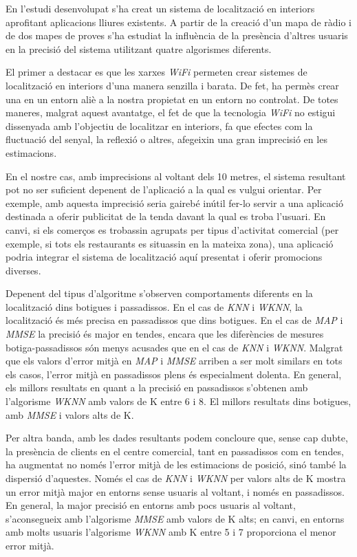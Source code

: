 
En l'estudi desenvolupat s'ha creat un sistema de localització en interiors aprofitant aplicacions lliures existents. A partir de la creació d'un mapa de ràdio i de dos mapes de proves s'ha estudiat la influència de la presència d'altres usuaris en la precisió del sistema utilitzant quatre algorismes diferents.

El primer a destacar es que les xarxes \textit{WiFi} permeten crear sistemes de localització en interiors d'una manera senzilla i barata. De fet, ha permès crear una en un entorn aliè a la nostra propietat en un entorn no controlat. De totes maneres, malgrat aquest avantatge, el fet de que la tecnologia \textit{WiFi} no estigui dissenyada amb l'objectiu de localitzar en interiors, fa  que efectes com la fluctuació del senyal, la reflexió o altres, afegeixin una gran imprecisió en les estimacions.

En el nostre cas, amb imprecisions al voltant dels 10 metres, el sistema resultant pot no ser suficient depenent de l'aplicació a la qual es vulgui orientar. Per exemple, amb aquesta imprecisió seria gairebé inútil fer-lo servir a una aplicació destinada a oferir publicitat de la tenda davant la qual es troba l'usuari. En canvi, si els comerços es trobassin agrupats per tipus d'activitat comercial (per exemple, si tots els restaurants es situassin en la mateixa zona), una aplicació podria integrar el sistema de localització aquí presentat i oferir promocions diverses.

Depenent del tipus d'algoritme s'observen comportaments diferents en la localització dins botigues i passadissos. En el cas de \textit{KNN} i \textit{WKNN}, la localització és més precisa en passadissos que dins botigues. En el cas de \textit{MAP} i \textit{MMSE} la precisió és major en tendes, encara que les diferències de mesures botiga-passadissos són menys acusades que en el cas de \textit{KNN} i \textit{WKNN}. Malgrat que els valors d'error mitjà en \textit{MAP} i \textit{MMSE} arriben a ser molt similars en tots els casos, l'error mitjà en passadissos plens és especialment dolenta. En general, els millors resultats en quant a la precisió en passadissos s'obtenen amb l'algorisme \textit{WKNN} amb valors de K entre 6 i 8. El millors resultats dins botigues, amb \textit{MMSE} i valors alts de K.

Per altra banda, amb les dades resultants podem concloure que, sense cap dubte, la presència de clients en el centre comercial, tant en passadissos com en tendes, ha augmentat no només l'error mitjà de les estimacions de posició, sinó també la dispersió d'aquestes. Només el cas de \textit{KNN} i \textit{WKNN} per valors alts de K mostra un error mitjà major en entorns sense usuaris al voltant, i només en passadissos. En general, la major precisió en entorns amb pocs usuaris al voltant, s'aconsegueix amb l'algorisme \textit{MMSE} amb valors de K alts; en canvi, en entorns amb molts usuaris l'algorisme \textit{WKNN} amb K entre 5 i 7 proporciona el menor error mitjà.

